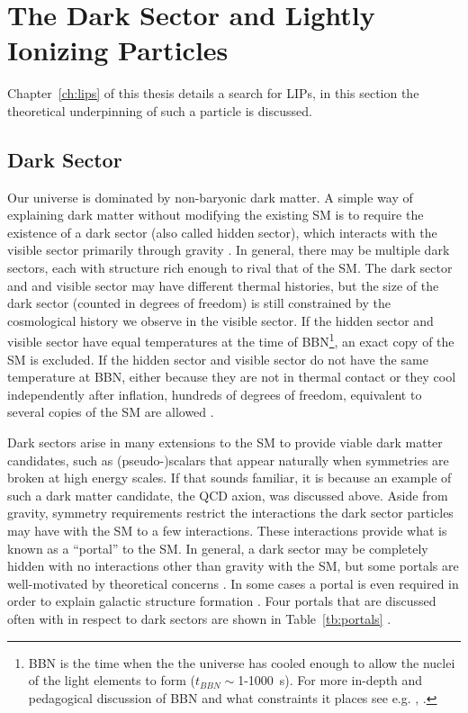 \section{The Dark Sector and Lightly Ionizing Particles}
\label{sec:dark_sector}
Chapter~\ref{ch:lips} of this thesis details a search for \ac{LIP}s, in this section the theoretical underpinning of such a particle is discussed. 

\subsection{Dark Sector}
Our universe is dominated by non-baryonic dark matter. A simple way of explaining dark matter without modifying the existing \ac{SM} is to require the existence of a dark sector (also called hidden sector), which interacts with the visible sector primarily through gravity \cite{Foot2014}. In general, there may be multiple dark sectors, each with structure rich enough to rival that of the \ac{SM}. The dark sector and and visible sector may have different thermal histories, but the size of the dark sector (counted in degrees of freedom) is still constrained by the cosmological history we observe in the visible sector. If the hidden sector and visible sector have equal temperatures at the time of \ac{BBN}\footnote{\ac{BBN} is the time when the the universe has cooled enough to allow the nuclei of the light elements to form ($t_{BBN}\sim$1-1000~s). For more in-depth and pedagogical discussion of \ac{BBN} and what constraints it places see e.g. \cite{Ryden2006}, \cite{Kolb1990}.}, an exact copy of the \ac{SM} is excluded. If the hidden sector and visible sector do not have the same temperature at \ac{BBN}, either because they are not in thermal contact or they cool independently after inflation, hundreds of degrees of freedom, equivalent to several copies of the \ac{SM} are allowed \cite{Feng2010}.

Dark sectors arise in many extensions to the \ac{SM} to provide viable dark matter candidates, such as (pseudo-)scalars that appear naturally when symmetries are broken at high energy scales. If that sounds familiar, it is because an example of such a dark matter candidate, the QCD axion, was discussed above. Aside from gravity, symmetry requirements restrict the interactions the dark sector particles may have with the \ac{SM} to a few interactions. These interactions provide what is known as a ``portal'' to the \ac{SM}. In general, a dark sector may be completely hidden with no interactions other than gravity with the \ac{SM}, but some portals are well-motivated by theoretical concerns \cite{Essig2013} \cite{Feng2010}. In some cases a portal is even required in order to explain galactic structure formation \cite{Foot2014}. Four portals that are discussed often with in respect to dark sectors are shown in Table~\ref{tb:portals} \cite{Essig2013}.

